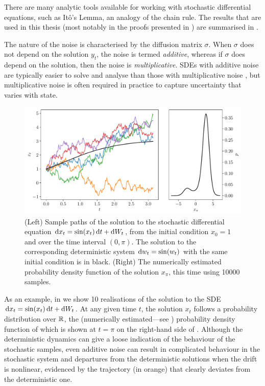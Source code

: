 There are many analytic tools available for working with stochastic differential equations, such as It\^o's Lemma, an analogy of the chain rule.
The results that are used in this thesis (most notably in the proofs presented in ) are summarised in .

The nature of the noise is characterised by the diffusion matrix \(\sigma\).
When \(\sigma\) does not depend on the solution \(y_t\), the noise is termed \emph{additive}, whereas if \(\sigma\) does depend on the solution, then the noise is \emph{multiplicative}.
SDEs with additive noise are typically easier to solve and analyse than those with multiplicative noise \citep{SanchoEtAl_1982_AnalyticalNumericalStudies}, but multiplicative noise is often required in practice to capture uncertainty that varies with state.

\begin{figure}
	\begin{center}
		\includegraphics[width=\textwidth]{chp02_background/figures/ou_solution.pdf}
		\caption{(Left) Sample paths of the solution to the stochastic differential equation \(\dif x_t = \sin\!\left(x_t\right)\dif t + \dif W_t\), from the initial condition \(x_0 = 1\) and over the time interval \((0,\pi)\).
			The solution to the corresponding deterministic system \(\dif w_t = \sin\!\left(w_t\right)\) with the same initial condition is in black.
			(Right) The numerically estimated probability density function of the solution \(x_\pi\), this time using 10000 samples.}
		\label{fig:sde_sol_sample}
	\end{center}
\end{figure}

As an example, in  we show 10 realisations of the solution to the SDE \(\dif x_t = \sin\!\left(x_t\right)\dif t + \dif W_t\).
At any given time \(t\), the solution \(x_t\) follows a probability distribution over \(\mathbb{R}\), the (numerically estimated---see ) probability density function of which is shown at \(t = \pi\) on the right-hand side of .
Although the deterministic dynamics can give a loose indication of the behaviour of the stochastic samples, even additive noise can result in complicated behaviour in the stochastic system and departures from the deterministic solutions when the drift is nonlinear, evidenced by the trajectory (in orange) that clearly deviates from the deterministic one.


